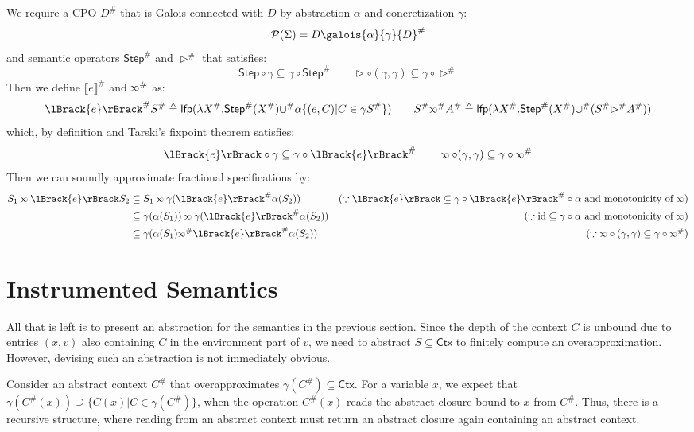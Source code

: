 \documentclass[acmsmall,screen,review]{acmart}\settopmatter{printfolios=true,printccs=false,printacmref=false}
\newcommand*{\pset}{\mathcal{P}}
\newcommand*{\Abs}[1]{{#1}^{\#}}
\newcommand*{\Ctx}{\mathsf{Ctx}}
\newcommand*{\lfp}{\mathsf{lfp}}
\newcommand*{\Step}{\mathsf{Step}}
\newcommand*{\semlink}{\mathbin{\rotatebox[origin=c]{180}{$\propto$}}}
\newcommand*{\sembracket}[1]{\lBrack{#1}\rBrack}
\begin{document}
We require a CPO $\Abs{D}$ that is Galois connected with $D$ by abstraction $\alpha$ and concretization $\gamma$:
\[\pset(\Sigma)=D\galois{\alpha}{\gamma}\Abs{D}\]
and semantic operators $\Abs\Step$ and $\Abs\rhd$ that satisfies:
\[\Step\circ\gamma\subseteq\gamma\circ\Abs\Step\qquad\rhd\circ(\gamma,\gamma)\subseteq\gamma\circ\Abs\rhd\]
Then we define $\Abs{\sembracket{e}}$ and $\Abs\semlink$ as:
\[
  \Abs{\sembracket{e}}\Abs{S}\triangleq\lfp(\lambda\Abs{X}.\Abs\Step(\Abs{X})\Abs\cup\alpha\{(e,C)|C\in\gamma\Abs{S}\})\qquad
  \Abs{S}\Abs\semlink\Abs{A}\triangleq\lfp(\lambda\Abs{X}.\Abs\Step(\Abs{X})\Abs\cup(\Abs{S}\Abs\rhd\Abs{A}))
\]
which, by definition and Tarski's fixpoint theorem satisfies:
\[\sembracket{e}\circ\gamma\subseteq\gamma\circ\Abs{\sembracket{e}}\qquad\semlink\circ(\gamma,\gamma)\subseteq\gamma\circ\Abs\semlink\]
Then we can soundly approximate fractional specifications by:
\begin{align*}
  S_1\semlink\sembracket{e}S_2 & \subseteq S_1\semlink\gamma(\Abs{\sembracket{e}}\alpha(S_2))                 & (\because\sembracket{e}\subseteq\gamma\circ\Abs{\sembracket{e}}\circ\alpha\text{ and monotonicity of }\semlink) \\
                               & \subseteq \gamma(\alpha(S_1))\semlink\gamma(\Abs{\sembracket{e}}\alpha(S_2)) & (\because\text{id}\subseteq\gamma\circ\alpha\text{ and monotonicity of }\semlink)                               \\
                               & \subseteq\gamma(\alpha(S_1)\Abs\semlink\Abs{\sembracket{e}}\alpha(S_2))      & (\because\semlink\circ(\gamma,\gamma)\subseteq\gamma\circ\Abs\semlink)
\end{align*}
\section{Instrumented Semantics}
All that is left is to present an abstraction for the semantics in the previous section.
Since the depth of the context $C$ is unbound due to entries $(x,v)$ also containing $C$ in the environment part of $v$, we need to abstract $S\subseteq\Ctx$ to finitely compute an overapproximation.
However, devising such an abstraction is not immediately obvious.

Consider an abstract context $\Abs{C}$ that overapproximates $\gamma(\Abs{C})\subseteq\Ctx$.
For a variable $x$, we expect that $\gamma(\Abs{C}(x))\supseteq\{C(x)|C\in\gamma(\Abs{C})\}$, when the operation $\Abs{C}(x)$ reads the abstract closure bound to $x$ from $\Abs{C}$.
Thus, there is a recursive structure, where reading from an abstract context must return an abstract closure again containing an abstract context.
\end{document}
